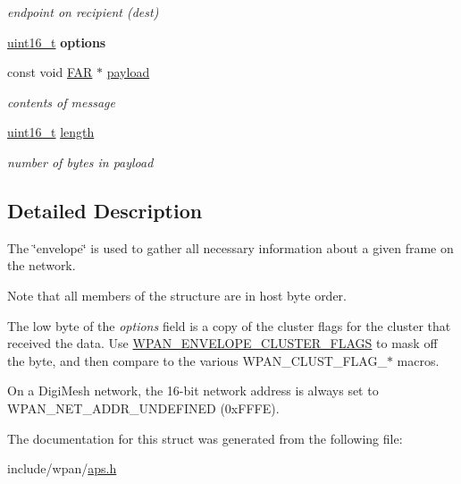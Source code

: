 \begin{DoxyCompactItemize}
\begin{DoxyCompactList}\small\item\em endpoint on recipient (dest) \end{DoxyCompactList}\item 
\hyperlink{group__hal__dos_ga5a8b2dc9e45a9ee81a94ef304fb62505}{uint16\+\_\+t} {\bfseries options}
\item 
const void \hyperlink{group__hal_gaef060b3456fdcc093a7210a762d5f2ed}{F\+AR} $\ast$ \hyperlink{group__wpan__aps_ga8737375e27cb391ff381fff10dc0c132}{payload}
\begin{DoxyCompactList}\small\item\em contents of message \end{DoxyCompactList}\item 
\hyperlink{group__hal__dos_ga5a8b2dc9e45a9ee81a94ef304fb62505}{uint16\+\_\+t} \hyperlink{group__wpan__aps_ga1892eba2086d12ac2b09005aeb09ea3b}{length}
\begin{DoxyCompactList}\small\item\em number of bytes in payload \end{DoxyCompactList}\end{DoxyCompactItemize}


\subsection{Detailed Description}
The \char`\"{}envelope\char`\"{} is used to gather all necessary information about a given frame on the network. 

Note that all members of the structure are in host byte order.

The low byte of the {\itshape options} field is a copy of the cluster flags for the cluster that received the data. Use \hyperlink{group__wpan__aps_ga6a6e8a32dc7117f44bdca2802a1e54aa}{W\+P\+A\+N\+\_\+\+E\+N\+V\+E\+L\+O\+P\+E\+\_\+\+C\+L\+U\+S\+T\+E\+R\+\_\+\+F\+L\+A\+GS} to mask off the byte, and then compare to the various W\+P\+A\+N\+\_\+\+C\+L\+U\+S\+T\+\_\+\+F\+L\+A\+G\+\_\+$\ast$ macros.

On a Digi\+Mesh network, the 16-\/bit network address is always set to W\+P\+A\+N\+\_\+\+N\+E\+T\+\_\+\+A\+D\+D\+R\+\_\+\+U\+N\+D\+E\+F\+I\+N\+ED (0x\+F\+F\+FE). 

The documentation for this struct was generated from the following file\+:\begin{DoxyCompactItemize}
\item 
include/wpan/\hyperlink{aps_8h}{aps.\+h}\end{DoxyCompactItemize}
